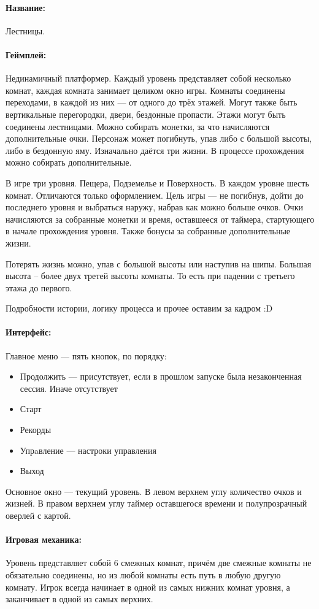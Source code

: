 \documentclass[12pt,a4paper]{article}
\begin{document}
             
\paragraph{Название:} Лестницы.
\paragraph{Геймплей:} Нединамичный платформер. Каждый уровень представляет собой несколько комнат, каждая комната занимает целиком окно игры. Комнаты соединены переходами, в каждой из них --- от одного до трёх этажей. Могут также быть вертикальные перегородки, двери, бездонные пропасти. Этажи могут быть соединены лестницами. Можно собирать монетки, за что начисляются дополнительные очки. Персонаж может погибнуть, упав либо с большой высоты, либо в бездонную яму. Изначально даётся три жизни. В процессе прохождения можно собирать дополнительные.

В игре три уровня. Пещера, Подземелье и Поверхность. В каждом уровне шесть комнат. Отличаются только оформлением. Цель игры --- не погибнув, дойти до последнего уровня и выбраться наружу, набрав как можно больше очков. Очки начисляются за собранные монетки и время, оставшееся от таймера, стартующего в начале прохождения уровня. Также бонусы за собранные дополнительные жизни.

Потерять жизнь можно, упав с большой высоты или наступив на шипы. Большая высота -- более двух третей высоты комнаты. То есть при падении с третьего этажа до первого.

Подробности истории, логику процесса и прочее оставим за кадром :D
\paragraph{Интерфейс:}
Главное меню --- пять кнопок, по порядку:
\begin{itemize}
\item Продолжить --- присутствует, если в прошлом запуске была незаконченная сессия. Иначе отсутствует
\item Старт
\item Рекорды
\item Упрaвление --- настроки управления
\item Выход
\end{itemize}
Основное окно --- текущий уровень. В левом верхнем углу количество очков и жизней. В правом верхнем углу таймер оставшегося времени и полупрозрачный оверлей с картой.
\paragraph{Игровая механика:}
Уровень представляет собой 6 смежных комнат, причём две смежные комнаты не обязательно соединены, но из любой комнаты есть путь в любую другую комнату. Игрок всегда начинает в одной из самых нижних комнат уровня, а заканчивает в одной из самых верхних.
\end{document}
